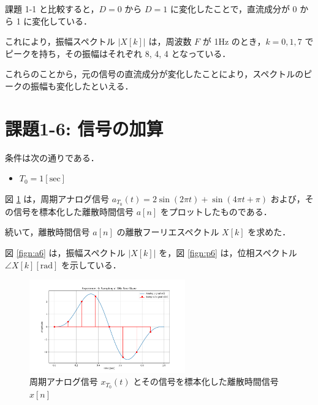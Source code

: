 \documentclass[fleqn, a4paper. 12pt]{jsarticle}
\begin{document}
    課題 1-1 と比較すると，$D = 0$ から $D = 1$ に変化したことで，直流成分が 0 から 1 に変化している．

    これにより，振幅スペクトル $|X[k]|$ は，周波数 $F$ が 1Hz のとき，$k=0, 1, 7$ でピークを持ち，その振幅はそれぞれ 8, 4, 4 となっている．

    これらのことから，元の信号の直流成分が変化したことにより，スペクトルのピークの振幅も変化したといえる．

  \newpage

  \section*{課題1-6: 信号の加算}

  条件は次の通りである．

  \begin{itemize}
    \item $T_0 = 1 [\mathrm{sec}]$
  \end{itemize}

  図 \ref{fig:s6} は，周期アナログ信号 $a_{T_0}(t)=2 \sin (2 \pi t)+\sin (4 \pi t+\pi)$ および，その信号を標本化した離散時間信号 $a[n]$ をプロットしたものである．

  続いて，離散時間信号 $a[n]$ の離散フーリエスペクトル $X[k]$ を求めた．

  図 \ref{fign:a6} は，振幅スペクトル $|X[k]|$ を，図 \ref{fign:p6} は，位相スペクトル $\angle X[k][\mathrm{rad}]$ を示している．

  \begin{figure}[!h]
    \centering
    \includegraphics[width=0.6\textwidth]{sampling_experiment_6.png}
    \caption{周期アナログ信号 $x_{T_0}(t)$ とその信号を標本化した離散時間信号 $x[n]$}
    \label{fig:s6}
  \end{figure}
\end{document}
